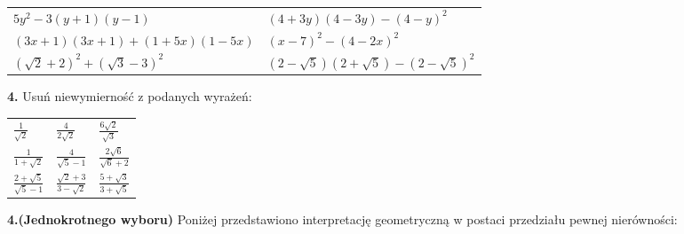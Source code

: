 \documentclass[12pt,a4paper]{article}
\theoremstyle{break}
\begin{document}
	\begin{enumerate}[a)] \begin{tabular}{p{8cm} p{8cm}} 
		\item $5y^2-3(y+1)(y-1)$ & \vspace{0.25cm}\item$(4+3y)(4-3y)-(4-y)^2$ \\
		\item $(3x+1)(3x+1)+(1+5x)(1-5x)$ & \item $(x-7)^2-(4-2x)^2$ \\
		\item $(\sqrt{2}+2)^2+(\sqrt{3}-3)^2$ & \item $(2-\sqrt{5})(2+\sqrt{5})-(2-\sqrt{5})^2$ \\
	\end{tabular} \end{enumerate}
	\newpage
\begin{mdframed}[style=zad]
		\vspace{0.2cm}
		\textbf{4.} Usuń niewymierność z podanych wyrażeń:
	\end{mdframed}
	
	\begin{enumerate}[a)] \begin{tabular}{p{5cm} p{5cm} p{5cm}} 
			\item \Large$\frac{1}{\sqrt{2}}$ & \vspace{0.25cm}\item\Large$\frac{4}{2\sqrt{2}}$ &\vspace{0.25cm}\item \Large$\frac{6\sqrt{2}}{\sqrt{3}}$\\
			\item \Large$\frac{1}{1+\sqrt{2}}$ & \item \Large$\frac{4}{\sqrt{5}-1}$ &\item \Large$\frac{2\sqrt{6}}{\sqrt{6}+2}$\\
			\item \Large$\frac{2+\sqrt{5}}{\sqrt{5}-1}$ & \item \Large$\frac{\sqrt{2}+3}{3-\sqrt{2}}$ &\item \Large$\frac{5+\sqrt{3}}{3+\sqrt{5}}$\\
	\end{tabular} \end{enumerate}
	
\begin{mdframed}[style=zad]
		\vspace{0.2cm}
		\textbf{4.}\textbf{(Jednokrotnego wyboru)} Poniżej przedstawiono interpretację geometryczną w postaci przedziału pewnej nierówności:
	\end{mdframed}
\end{document}
